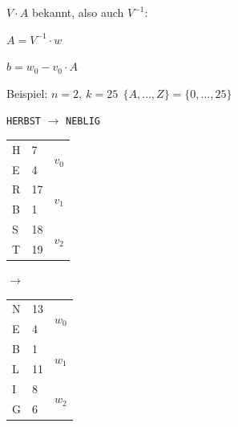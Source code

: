 $V \cdot A$ bekannt, also auch $V^{-1}$:

$A=V^{-1} \cdot w$

$b=w_0 - v_0 \cdot A$

Beispiel: $n=2,\ k=25 \ \ \{A,\ldots, Z\}=\{0,\ldots,25\}$

\begin{center}
\texttt{HERBST} $\longrightarrow$ \texttt{NEBLIG}

\begin{tabular}{l|l|l}
H & 7 & \multirow{2}{*}{$v_0$} \\
E & 4 & \\
\hline
R & 17 & \multirow{2}{*}{$v_1$} \\
B & 1 & \\
\hline
S & 18 & \multirow{2}{*}{$v_2$} \\
T & 19 &
\end{tabular}
$\longrightarrow$
\begin{tabular}{l|l|l}
N & 13 & \multirow{2}{*}{$w_0$} \\
E & 4 & \\
\hline
B & 1 & \multirow{2}{*}{$w_1$} \\
L & 11 & \\
\hline
I & 8 & \multirow{2}{*}{$w_2$} \\
G & 6 &
\end{tabular}
\end{center}
